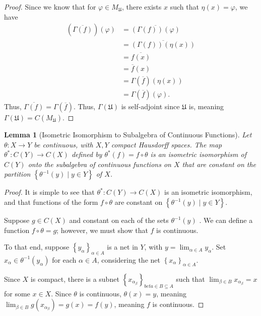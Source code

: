 \documentclass[10pt]{extarticle}
\newcommand{\set}[1]{\left\{#1\right\}}
\theoremstyle{plain}
\newtheorem*{lemma}{Lemma}
\theoremstyle{definition}
\theoremstyle{note}
\renewcommand{\newline}{\hfill\break}
\begin{document}
\begin{proof}
  Since we know that for $\varphi \in M_{\mathfrak{U}}$, there exists $x$ such that $\eta(x) = \varphi$, we have
  \begin{align*}
    \left(\overline{\Gamma(f)}\right)\left(\varphi\right) &= \overline{\left(\Gamma(f)\right)\left(\varphi\right)}\\
                                                          &= \overline{\left(\Gamma(f)\right)\left(\eta(x)\right)}\\
                                                          &= \overline{f(x)}\\
                                                          &= \overline{f}(x)\\
                                                    &= \Gamma\left(\overline{f}\right)\left(\eta(x)\right)\\
                                                    &= \Gamma\left(\overline{f}\right)\left(\varphi\right).
  \end{align*}
  Thus, $\overline{\Gamma\left(f\right)} = \Gamma\left(\overline{f}\right)$. Thus, $\Gamma\left(\mathfrak{U}\right)$ is self-adjoint since $\mathfrak{U}$ is, meaning $\Gamma\left(\mathfrak{U}\right) = C\left(M_{\mathfrak{U}}\right)$.
\end{proof}
\begin{lemma}[Isometric Isomorphism to Subalgebra of Continuous Functions]
  Let $\theta: X\rightarrow Y$ be continuous, with $X,Y$ compact Hausdorff spaces. The map $\theta^{\ast}: C(Y) \rightarrow C(X)$ defined by $\theta^{\ast}\left(f\right) = f \circ \theta$ is an isometric isomorphism of $C(Y)$ onto the subalgebra of continuous functions on $X$ that are constant on the partition $\set{\theta^{-1}\left(y\right)\mid y\in Y}$ of $X$.
\end{lemma}
\begin{proof}
  It is simple to see that $\theta^{\ast}: C(Y) \rightarrow C(X)$ is an isometric isomorphism, and that functions of the form $f\circ \theta$ are constant on $\set{\theta^{-1}\left(y\right)\mid y\in Y}$.\newline

  Suppose $g\in C(X)$ and constant on each of the sets $\theta^{-1}\left(y\right)$ . We can define a function $f\circ \theta = g$; however, we must show that $f$ is continuous.\newline

  To that end, suppose $\set{y_{\alpha}}_{\alpha \in A}$ is a net in $Y$, with $y = \lim_{\alpha \in A}y_{\alpha}$. Set $x_{\alpha}\in \theta^{-1}\left(y_{\alpha}\right)$ for each $\alpha \in A$, considering the net $\set{x_{\alpha}}_{\alpha\in A}$.\newline

  Since $X$ is compact, there is a subnet $\set{x_{\alpha_{\beta}}}_{beta\in B\subseteq A}$ such that $\lim_{\beta \in B}x_{\alpha_{\beta}} = x$ for some $x\in X$. Since $\theta$ is continuous, $\theta(x) = y$, meaning $\lim_{\beta \in B}g\left(x_{\alpha_\beta}\right) = g(x) = f(y)$, meaning $f$ is continuous.
\end{proof}
\end{document}

